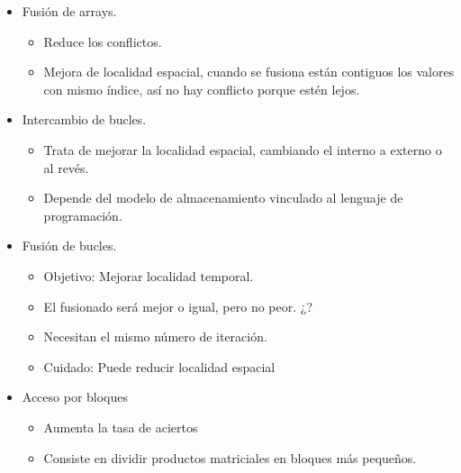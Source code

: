 \documentclass[12pt, twoside, openright]{report} %
\begin{document}
\begin{itemize}
	      \begin{itemize}
		      \item Fusión de arrays.

		            \begin{itemize}

			            \item Reduce los conflictos.
			            \item Mejora de localidad espacial, cuando se fusiona están
			                  contiguos los valores con mismo índice, así no hay conflicto
			                  porque estén lejos.
		            \end{itemize}
		      \item Intercambio de bucles.

		            \begin{itemize}

			            \item Trata de mejorar la localidad espacial, cambiando el interno a
			                  externo o al revés.
			            \item Depende del modelo de almacenamiento vinculado al lenguaje de
			                  programación.
		            \end{itemize}
		      \item Fusión de bucles.

		            \begin{itemize}

			            \item Objetivo: Mejorar localidad temporal.
			            \item El fusionado será mejor o igual, pero no peor. ¿?
			            \item Necesitan el mismo número de iteración.
			            \item Cuidado: Puede reducir localidad espacial
		            \end{itemize}
		      \item Acceso por bloques

		            \begin{itemize}

			            \item Aumenta la tasa de aciertos
			            \item Consiste en dividir productos matriciales en bloques más
			                  pequeños.
		            \end{itemize}
	      \end{itemize}
\end{itemize}
\end{document}
